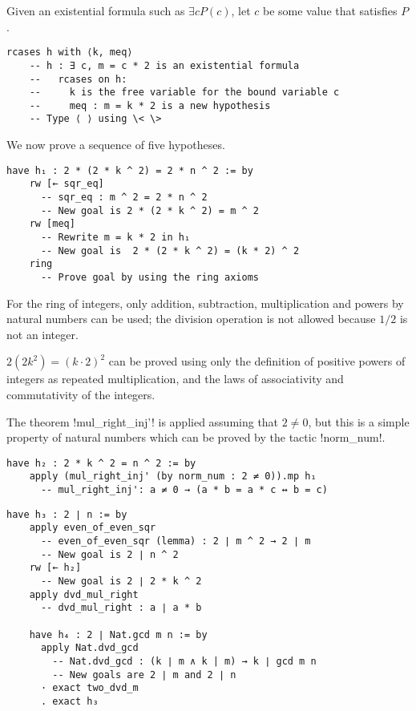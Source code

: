 \newpage

Given an existential formula such as $\exists c P(c)$, let $c$ be some value that satisfies $P$.
\begin{Verbatim}[firstnumber=last]
  rcases h with ⟨k, meq⟩
    -- h : ∃ c, m = c * 2 is an existential formula
    --   rcases on h:
    --     k is the free variable for the bound variable c
    --     meq : m = k * 2 is a new hypothesis
    -- Type ⟨ ⟩ using \< \>
\end{Verbatim}


We now prove a sequence of five hypotheses.
\begin{Verbatim}[firstnumber=last]
  have h₁ : 2 * (2 * k ^ 2) = 2 * n ^ 2 := by
    rw [← sqr_eq]
      -- sqr_eq : m ^ 2 = 2 * n ^ 2
      -- New goal is 2 * (2 * k ^ 2) = m ^ 2
    rw [meq]
      -- Rewrite m = k * 2 in h₁
      -- New goal is  2 * (2 * k ^ 2) = (k * 2) ^ 2
    ring
      -- Prove goal by using the ring axioms
\end{Verbatim}

For the ring of integers, only addition, subtraction, multiplication and powers by natural numbers can be used; the division operation is not allowed because $1/2$ is not an integer.

$2(2k^2)=(k\cdot 2)^2$ can be proved using only the definition of positive powers of integers as repeated multiplication, and the laws of associativity and commutativity of the integers.

The theorem !mul_right_inj'! is applied assuming that $2\neq 0$, but this is a simple property of natural numbers which can be proved by the tactic !norm_num!.
\begin{Verbatim}[firstnumber=last]
  have h₂ : 2 * k ^ 2 = n ^ 2 := by
    apply (mul_right_inj' (by norm_num : 2 ≠ 0)).mp h₁
      -- mul_right_inj': a ≠ 0 → (a * b = a * c ↔ b = c)
\end{Verbatim}


\begin{Verbatim}[firstnumber=last]
  have h₃ : 2 ∣ n := by
    apply even_of_even_sqr
      -- even_of_even_sqr (lemma) : 2 ∣ m ^ 2 → 2 ∣ m
      -- New goal is 2 ∣ n ^ 2
    rw [← h₂]
      -- New goal is 2 ∣ 2 * k ^ 2
    apply dvd_mul_right
      -- dvd_mul_right : a ∣ a * b

    have h₄ : 2 ∣ Nat.gcd m n := by
      apply Nat.dvd_gcd
        -- Nat.dvd_gcd : (k ∣ m ∧ k | m) → k ∣ gcd m n
        -- New goals are 2 ∣ m and 2 ∣ n
      · exact two_dvd_m
      . exact h₃
\end{Verbatim}

